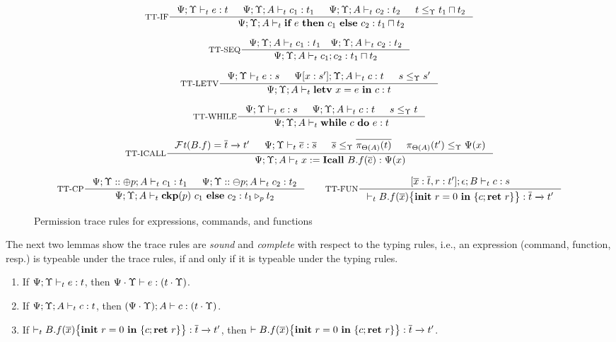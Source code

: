 {{{\begin{figure*}[ht]
\begin{scriptsize}
\[
\inference[TT-IF]
{
\Psi;\trace \vdash_{t} e : t &
\Psi;\trace; A \vdash_{t} c_1 : t_1 &
\Psi;\trace; A \vdash_{t} c_2 : t_2 &
t \leq_{\trace} t_1\sqcap t_2
}
{\Psi;\trace;  A \vdash_{t} \lcIF{e}{c_1}{c_2} : t_1\sqcap t_2}
\]

\[
\inference[TT-SEQ]
{\Psi;\trace; A \vdash_{t} c_1 : t_1 \quad \Psi;\trace; A \vdash_{t} c_2 : t _2}
{\Psi;\trace; A \vdash_{t} \lcSEQ{c_1}{c_2} : t_1\sqcap t_2}
\]

\[
\inference[TT-LETV]
{\Psi;\trace \vdash_{t} e : s &
\Psi[x:s']; \trace; A \vdash_{t} c : t & s \leq_{\trace} s' }
{\Psi;\trace; A\vdash_{t} \lcLETV{x}{e}{c} :  t}
\]

\[
\inference[TT-WHILE]
{
\Psi;\trace \vdash_{t} e : s &
\Psi;\trace; A \vdash_{t} c : t &  s\leq_{\trace} t  }
{\Psi;\trace; A \vdash_{t} \lcWHILE{c}{e} : t }
\]

\[
\inference[TT-ICALL]
{
\FT(B.f) = \overline{t} \xrightarrow{} t'  &
\Psi;\trace \vdash_{t} \overline{e} : \overline{s} &
\overline{s}\leq_{\trace} \overline{\app{t}{\Theta(A)}} &
\app{t'}{\Theta(A)}\leq_{\trace} \Psi(x)
}
{\Psi;\trace; A \vdash_{t} \lcCALL{x}{B.f}{\overline{e}} : \Psi(x)}
\]

\[
\inference[TT-CP]
{\Psi;\trace::\tplus{ p}; A \vdash_{t} c_1 : t_1 &
\Psi;\trace::\tminus{p}; A \vdash_{t} c_2 : t_2}
{\Psi;\trace; A \vdash_{t} \lcCP{p}{c_1}{c_2} : \omerge{p} {t_1}{t_2}}
\qquad
\inference[TT-FUN]
{
[\overline{ x}: \overline{t},\lpRES:t'];\epsilon; B \vdash_{t} c : s
}
{\vdash_{t} \lpPROG{B.f}{\overline{x}}{c}{\lpRES} :  \overline{t}\xrightarrow{} t'}
\]
\end{scriptsize}
\caption{Permission trace rules for expressions, commands, and functions} \label{fig:infer-rules}
\end{figure*}

 

The next two lemmas show the trace rules are \emph{sound} and \emph{complete} with respect to the typing rules, i.e., an expression (command, function, resp.)  is typeable under the trace rules, if and only if it is typeable under the typing rules.

\begin{lemma}\label{lem:ptrsound}
{\myeqsize
\begin{enumerate}[label=(\alph*),topsep=1pt,itemsep=-1ex,partopsep=1ex,parsep=0ex]
\item\label{lem:ptrsound-1} If $\Psi;\Upsilon\vdash_{t} e : t$, then $\Psi\cdot\Upsilon\vdash e : (t\cdot\Upsilon)$.
\item\label{lem:ptrsound-2} If $\Psi;\Upsilon; A \vdash_{t} c : t$, then $(\Psi\cdot\Upsilon); A \vdash c : (t\cdot\Upsilon)$.
\item\label{lem:ptrsound-3} If $\vdash_{t} {B.f}(\overline{x})\big\{{{\textbf{init}~ {r}=0 ~\textbf{in}~\{{c};\textbf{ret}~{r}\}}}\big\}  : \overline{t}\xrightarrow{} t'$, then $ \vdash {B.f}(\overline{x})\big\{{{\textbf{init}~ {r}=0 ~\textbf{in}~\{{c};\textbf{ret}~{r}\}}}\big\}  : \overline{t}\xrightarrow{} t'$.
\end{enumerate}}
\end{lemma}


}}}
